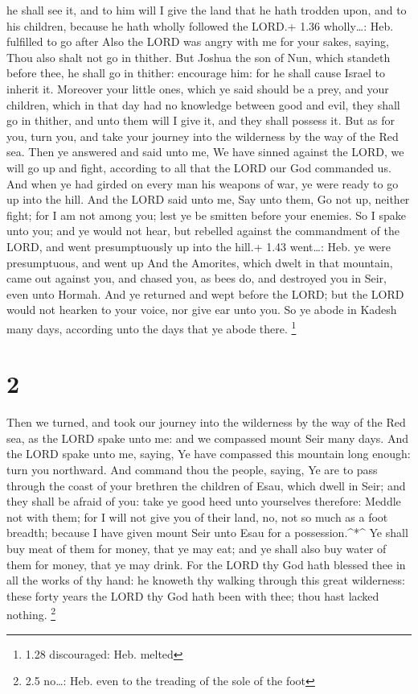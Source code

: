 he shall see it, and to him will I give the land that he hath trodden
upon, and to his children, because he hath wholly followed the LORD.+
1.36 wholly\ldots: Heb. fulfilled to go after  Also the
LORD was angry with me for your sakes, saying, Thou also shalt not go in
thither.  But Joshua the son of Nun, which standeth before
thee, he shall go in thither: encourage him: for he shall cause Israel
to inherit it.  Moreover your little ones, which ye said
should be a prey, and your children, which in that day had no knowledge
between good and evil, they shall go in thither, and unto them will I
give it, and they shall possess it.  But as for you, turn
you, and take your journey into the wilderness by the way of the Red
sea.  Then ye answered and said unto me, We have sinned
against the LORD, we will go up and fight, according to all that the
LORD our God commanded us. And when ye had girded on every man his
weapons of war, ye were ready to go up into the hill.  And
the LORD said unto me, Say unto them, Go not up, neither fight; for I am
not among you; lest ye be smitten before your enemies.  So
I spake unto you; and ye would not hear, but rebelled against the
commandment of the LORD, and went presumptuously up into the hill.+ 1.43
went\ldots: Heb. ye were presumptuous, and went up  And the
Amorites, which dwelt in that mountain, came out against you, and chased
you, as bees do, and destroyed you in Seir, even unto Hormah.
 And ye returned and wept before the LORD; but the LORD
would not hearken to your voice, nor give ear unto you.  So
ye abode in Kadesh many days, according unto the days that ye abode
there. \footnote{1.28 discouraged: Heb. melted}

\hypertarget{section-1}{%
\section{2}\label{section-1}}

 Then we turned, and took our journey into the wilderness by
the way of the Red sea, as the LORD spake unto me: and we compassed
mount Seir many days.  And the LORD spake unto me, saying,
 Ye have compassed this mountain long enough: turn you
northward.  And command thou the people, saying, Ye are to
pass through the coast of your brethren the children of Esau, which
dwell in Seir; and they shall be afraid of you: take ye good heed unto
yourselves therefore:  Meddle not with them; for I will not
give you of their land, no, not so much as a foot breadth; because I
have given mount Seir unto Esau for a possession.\^{}*\^{} 
Ye shall buy meat of them for money, that ye may eat; and ye shall also
buy water of them for money, that ye may drink.  For the
LORD thy God hath blessed thee in all the works of thy hand: he knoweth
thy walking through this great wilderness: these forty years the LORD
thy God hath been with thee; thou hast lacked nothing. \footnote{2.5
  no\ldots: Heb. even to the treading of the sole of the foot}

